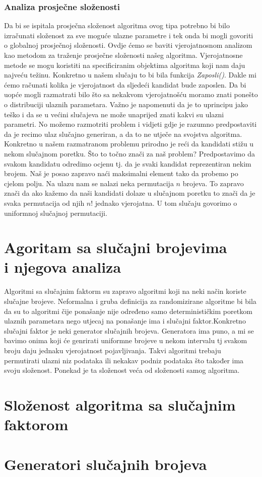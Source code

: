 \documentclass[10pt,a4paper]{article}
\begin{document}
\subsubsection*{Analiza prosječne složenosti}
Da bi se ispitala prosječna složenost algoritma ovog tipa potrebno bi bilo izračunati složenost za sve 
moguće ulazne parametre i tek onda bi mogli govoriti o globalnoj prosječnoj složenosti. Ovdje ćemo se 
baviti vjerojatnosnom analizom kao metodom za traženje prosječne složenosti našeg algoritma. Vjerojatnosne 
metode se mogu koristiti na specificiranim objektima algoritma koji nam daju najveću težinu. Konkretno u našem 
slučaju to bi bila funkcija \textit{Zaposli()}. Dakle mi ćemo računati kolika je vjerojatnost da sljedeći kandidat 
bude zaposlen. Da bi uopće mogli razmatrati bilo što sa nekakvom vjerojatnošću moramo znati ponešto o distribuciji
ulaznih parametara. Važno je napomenuti da je to uprincipu jako teško i da se u većini slučajeva ne može unaprijed
znati kakvi su ulazni parametri. No možemo razmotriti problem i vidjeti gdje je razumno predpostaviti da je recimo
ulaz slučajno generiran, a da to ne utječe na svojstva algoritma. Konkretno u našem razmatranom problemu prirodno
je reći da kandidati stižu u nekom slučajnom poretku. Što to točno znači za naš problem?
Predpostavimo da svakom kandidatu odredimo ocjenu tj. da je svaki kandidat reprezentiran nekim brojem. Naš je posao 
zapravo naći maksimalni element tako da probemo po cjelom polju. Na ulazu nam se nalazi neka permutacija $n$ brojeva. 
To zapravo znači da ako kažemo da naši kandidati dolaze u slučajnom poretku to znači da je svaka permutacija od njih $n!$ 
jednako vjerojatna. U tom slučaju govorimo o uniformnoj slučajnoj permutaciji.
\section{Agoritam sa slučajni brojevima\\ i njegova analiza}
Algoritmi sa slučajnim faktorm su zapravo algoritmi koji na neki način koriste slučajne brojeve. Neformalna i gruba definicija 
za randomizirane algoritme bi bila da su to algoritmi čije ponašanje nije određeno samo determinističkim poretkom ulaznih 
parametara nego utjecaj na ponašanje ima i slučajni faktor.Konkretno slučajni faktor je neki generator slučajnih brojeva. 
Generatora ima puno, a mi se bavimo onima koji će genrirati uniformne brojeve u nekom intervalu tj svakom broju daju jednaku 
vjerojatnost pojavljivanja. Takvi algoritmi trebaju permutirati ulazni niz podataka ili nekakav podniz podataka što također 
ima svoju složenost. Ponekad je ta složenost veća od složenosti samog algoritma.

\section{Složenost algoritma sa slučajnim faktorom}

\section{Generatori slučajnih brojeva}

\end{document}
